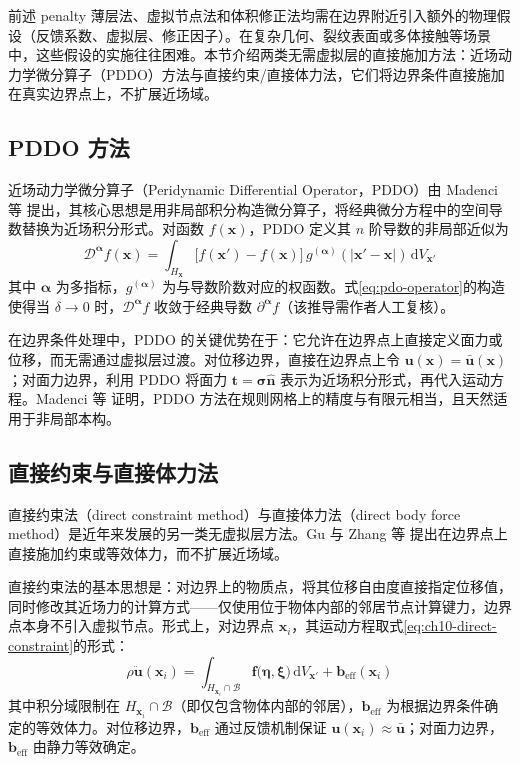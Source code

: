 前述 penalty 薄层法、虚拟节点法和体积修正法均需在边界附近引入额外的物理假设（反馈系数、虚拟层、修正因子）。在复杂几何、裂纹表面或多体接触等场景中，这些假设的实施往往困难。本节介绍两类无需虚拟层的直接施加方法：近场动力学微分算子（PDDO）方法与直接约束\slash 直接体力法，它们将边界条件直接施加在真实边界点上，不扩展近场域。

\subsection{PDDO 方法}

近场动力学微分算子（Peridynamic Differential Operator，PDDO）由 Madenci 等 \cite{Madenci2016} 提出，其核心思想是用非局部积分构造微分算子，将经典微分方程中的空间导数替换为近场积分形式。对函数 $f(\mathbf{x})$，PDDO 定义其 $n$ 阶导数的非局部近似为
\begin{equation}
\mathcal{D}^{\boldsymbol{\alpha}}f(\mathbf{x}) = \int_{H_{\mathbf{x}}} \bigl[f(\mathbf{x}')-f(\mathbf{x})\bigr]\,g^{(\boldsymbol{\alpha})}(|\mathbf{x}'-\mathbf{x}|)\,\mathrm{d}V_{\mathbf{x}'}
\label{eq:pdo-operator}
\end{equation}
其中 $\boldsymbol{\alpha}$ 为多指标，$g^{(\boldsymbol{\alpha})}$ 为与导数阶数对应的权函数。式\eqref{eq:pdo-operator}的构造使得当 $\delta\to 0$ 时，$\mathcal{D}^{\boldsymbol{\alpha}}f$ 收敛于经典导数 $\partial^{\boldsymbol{\alpha}}f$（该推导需作者人工复核）。

在边界条件处理中，PDDO 的关键优势在于：它允许在边界点上直接定义面力或位移，而无需通过虚拟层过渡。对位移边界，直接在边界点上令 $\mathbf{u}(\mathbf{x})=\bar{\mathbf{u}}(\mathbf{x})$；对面力边界，利用 PDDO 将面力 $\mathbf{t}=\boldsymbol{\sigma}\hat{\mathbf{n}}$ 表示为近场积分形式，再代入运动方程。Madenci 等 \cite{Madenci2016} 证明，PDDO 方法在规则网格上的精度与有限元相当，且天然适用于非局部本构。

\subsection{直接约束与直接体力法}

直接约束法（direct constraint method）与直接体力法（direct body force method）是近年来发展的另一类无虚拟层方法。Gu 与 Zhang 等 \cite{GuZhang2019,GuMadenciZhang2018,GuZhangMadenciXia2019} 提出在边界点上直接施加约束或等效体力，而不扩展近场域。

直接约束法的基本思想是：对边界上的物质点，将其位移自由度直接指定位移值，同时修改其近场力的计算方式——仅使用位于物体内部的邻居节点计算键力，边界点本身不引入虚拟节点。形式上，对边界点 $\mathbf{x}_{i}$，其运动方程取式\eqref{eq:ch10-direct-constraint}的形式：
\begin{equation}
\rho\ddot{\mathbf{u}}(\mathbf{x}_{i}) = \int_{H_{\mathbf{x}_{i}}\cap\mathcal{B}} \mathbf{f}\bigl(\boldsymbol{\eta},\boldsymbol{\xi}\bigr)\,\mathrm{d}V_{\mathbf{x}'} + \mathbf{b}_{\text{eff}}(\mathbf{x}_{i})
\label{eq:ch10-direct-constraint}
\end{equation}
其中积分域限制在 $H_{\mathbf{x}_{i}}\cap\mathcal{B}$（即仅包含物体内部的邻居），$\mathbf{b}_{\text{eff}}$ 为根据边界条件确定的等效体力。对位移边界，$\mathbf{b}_{\text{eff}}$ 通过反馈机制保证 $\mathbf{u}(\mathbf{x}_{i})\approx\bar{\mathbf{u}}$；对面力边界，$\mathbf{b}_{\text{eff}}$ 由静力等效确定。

